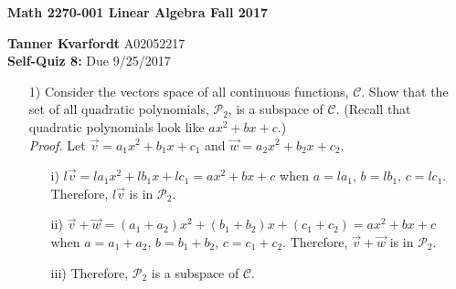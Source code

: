 \documentclass[12pt,pdftex]{article}
\begin{document}
\begin{center}
\textbf{Math 2270-001 \hspace{10pt} Linear Algebra \hspace{10pt} Fall 2017}
\end{center}


\noindent \textbf{Tanner Kvarfordt}  A02052217\\
\noindent \textbf{Self-Quiz 8:}  Due 9/25/2017\\



\begin{itemize}

\item[1)] Consider the vectors space of all continuous functions, $\mathcal{C}$.  Show that the set of all quadratic polynomials, $\mathcal{P}_2$, is a subspace of $\mathcal{C}$.  (Recall that quadratic polynomials look like $ax^2+bx+c$.) \\
\textit{Proof.} Let $\vec{v}=a_1x^2+b_1x+c_1$ and $\vec{w}=a_2x^2+b_2x+c_2$.
	\begin{itemize}
	\item[i)] $l\vec{v}=la_1x^2+lb_1x+lc_1 = ax^2+bx+c$ when $a=la_1$, $b=lb_1$, $c=lc_1$. Therefore, $l\vec{v}$ is in	  $\mathcal{P}_2$.
    \item[ii)] $\vec{v}+\vec{w}=(a_1+a_2)x^2+(b_1+b_2)x+(c_1+c_2)=ax^2+bx+c$ when $a=a_1+a_2$, $b=b_1+b_2$, 			$c=c_1+c_2$. Therefore, $\vec{v}+\vec{w}$ is in $\mathcal{P}_2$.
    \item[iii)] Therefore, $\mathcal{P}_2$ is a subspace of $\mathcal{C}$.
	\end{itemize}


\end{itemize}
\end{document}
